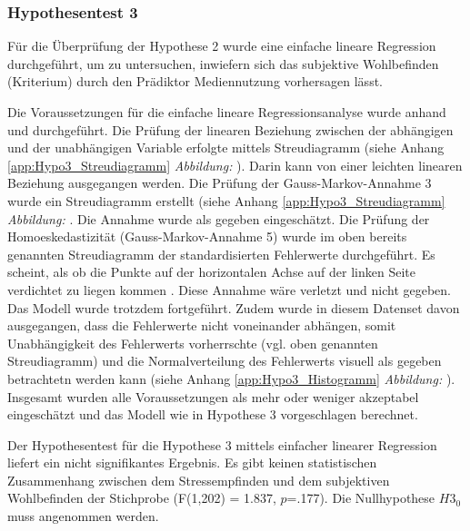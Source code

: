 \subsubsection{Hypothesentest 3}
Für die Überprüfung der Hypothese 2 wurde eine einfache lineare Regression durchgeführt, um zu untersuchen, inwiefern sich das subjektive Wohlbefinden (Kriterium) durch den Prädiktor Mediennutzung vorhersagen lässt.

Die Voraussetzungen für die einfache lineare Regressionsanalyse wurde anhand  und  durchgeführt. Die Prüfung der linearen Beziehung zwischen der abhängigen und der unabhängigen Variable erfolgte mittels Streudiagramm (siehe Anhang \ref{app:Hypo3_Streudiagramm}  \textit{Abbildung: }). Darin kann von einer leichten linearen Beziehung ausgegangen werden. Die Prüfung der Gauss-Markov-Annahme 3 \cite{UniversitatZurich2018} wurde ein Streudiagramm erstellt (siehe Anhang \ref{app:Hypo3_Streudiagramm} \textit{Abbildung: }. Die Annahme wurde als gegeben eingeschätzt. Die Prüfung der Homoeskedastizität (Gauss-Markov-Annahme 5) wurde im oben bereits genannten Streudiagramm der standardisierten Fehlerwerte durchgeführt. Es scheint, als ob die Punkte auf der horizontalen Achse auf der linken Seite verdichtet zu liegen kommen \cite{Hemmerich2018}. Diese Annahme wäre verletzt und nicht gegeben. Das Modell wurde trotzdem fortgeführt. Zudem wurde in diesem Datenset davon ausgegangen, dass die Fehlerwerte nicht voneinander abhängen, somit Unabhängigkeit des Fehlerwerts vorherrschte (vgl. oben genannten Streudiagramm) und die Normalverteilung des Fehlerwerts visuell als gegeben betrachtetn werden kann (siehe Anhang \ref{app:Hypo3_Histogramm} \textit{Abbildung: }). Insgesamt wurden alle Voraussetzungen als mehr oder weniger akzeptabel eingeschätzt und das Modell wie in Hypothese 3 vorgeschlagen berechnet.

Der Hypothesentest für die Hypothese 3 mittels einfacher linearer Regression liefert ein nicht signifikantes Ergebnis. Es gibt keinen statistischen Zusammenhang zwischen dem Stressempfinden und dem subjektiven Wohlbefinden der Stichprobe (F(1,202) = 1.837, $p$=.177).  Die Nullhypothese $H3_{0}$ muss angenommen werden.


